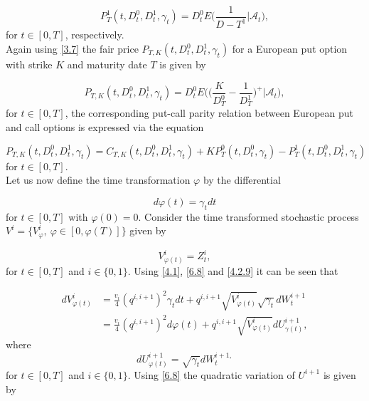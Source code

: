 \documentclass[a4 paper, 12pt]{report}
\theoremstyle{plain}
\begin{document}
\begin{equation}\label{6.5}
P_T^1(t,D_t^0, D_t^1, \gamma_t) = D_t^0 E\bigg(\frac{1}{D-T^1}\bigg|\mathcal{A}_t\bigg),
\end{equation}
for $t\in[0,T]$, respectively.\\
Again using \eqref{3.7} the fair price $P_{T,K}(t,D_t^0,D_t^1, \gamma_t)$ for a European put option with strike $K$ and maturity date $T$ is given by

\begin{equation}\label{6.6}
P_{T,K}(t,D_t^0,D_t^1,\gamma_t) = D_t^0E\bigg(\bigg(\frac{K}{D_T^0} - \frac{1}{D_T^1}\bigg)^+\bigg|\mathcal{A}_t\bigg),
\end{equation}
for $t\in[0,T]$, the corresponding put-call parity relation between European put and call options is expressed via the equation

\begin{equation}\label{6.7}
P_{T,K}(t,D_t^0,D_t^1,\gamma_t) = C_{T,K}(t,D_t^0,D_t^1, \gamma_t)+KP_T^0(t,D_t^0,\gamma_t) - P_T^1(t,D_t^0, D_t^1, \gamma_t)
\end{equation}
for $t\in[0,T]$.\\
Let us now define the time transformation $\varphi$ by the differential

\begin{equation}\label{6.8}
d\varphi(t) = \gamma_tdt
\end{equation}
for $t\in[0,T]$ with $\varphi(0) = 0$. Consider the time transformed stochastic process $V^i = \{V^i_{\varphi},~\varphi\in[0,\varphi(T)]\}$ given by 

\begin{equation}\label{4.2.9}
V_{\varphi(t)}^i = Z_t^i,
\end{equation}
for $t\in[0,T]$ and $i\in\{0,1\}$. Using \eqref{4.1}, \eqref{6.8} and \eqref{4.2.9} it can be seen that

\begin{equation}\label{4.2.10}
\begin{split}
dV_{\varphi(t)}^i& = \frac{v_i}{4}(q^{i,i+1})^2\gamma_tdt+q^{i,i+1}\sqrt{V^i_{\varphi(t)}}\sqrt{\gamma_t}dW_t^{i+1}\\
& = \frac{v_i}{4}(q^{i,i+1})^2d\varphi(t)+q^{i,i+1}\sqrt{V^i_{\varphi(t)}}dU_{\gamma(t)}^{i+1},%
\end{split}
\end{equation}
where
$$
dU_{\varphi(t)}^{i+1} = \sqrt{\gamma_t}dW_t^{i+1,}
$$
for $t\in[0,T]$ and $i\in\{0,1\}$. Using \eqref{6.8} the quadratic variation of $U^{i+1}$ is given by
\end{document}
